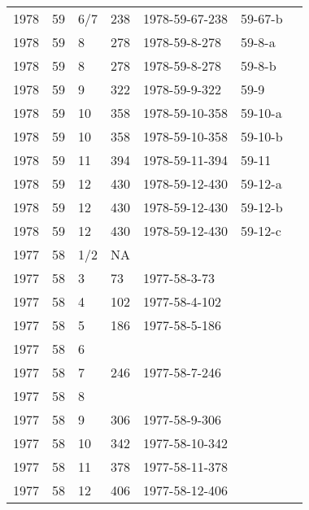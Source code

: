 \begin{longtable}{ |l|l|l|l|p{2.7cm}|l|p{2cm}| }
 1978 & 59 &   6/7 &     238 & 1978-59-67-238 & 59-67-b & \\
 1978 & 59 &     8 &     278 & 1978-59-8-278  & 59-8-a & \\
 1978 & 59 &     8 &     278 & 1978-59-8-278  & 59-8-b & \\
 1978 & 59 &     9 &     322 & 1978-59-9-322  & 59-9  & \\
 1978 & 59 &    10 &     358 & 1978-59-10-358 & 59-10-a & \\
 1978 & 59 &    10 &     358 & 1978-59-10-358 & 59-10-b & \\
 1978 & 59 &    11 &     394 & 1978-59-11-394 & 59-11 & \\
 1978 & 59 &    12 &     430 & 1978-59-12-430 & 59-12-a & \\
 1978 & 59 &    12 &     430 & 1978-59-12-430 & 59-12-b & \\
 1978 & 59 &    12 &     430 & 1978-59-12-430 & 59-12-c & \\
 1977 & 58 &   1/2 &      NA &                &  &  \\
 1977 & 58 &     3 &      73 & 1977-58-3-73   &  & \\
 1977 & 58 &     4 &     102 & 1977-58-4-102  &  & \\
 1977 & 58 &     5 &     186 & 1977-58-5-186  &  & \\
 1977 & 58 &     6 &         &                &  & \\
 1977 & 58 &     7 &     246 & 1977-58-7-246  &  & \\
 1977 & 58 &     8 &         &                &  & \\
 1977 & 58 &     9 &     306 & 1977-58-9-306  &  & \\
 1977 & 58 &    10 & 342     & 1977-58-10-342 &  & \\
 1977 & 58 &    11 &   378   & 1977-58-11-378 &  & \\
 1977 & 58 &    12 &    406  & 1977-58-12-406 &  & \\
\end{longtable}
